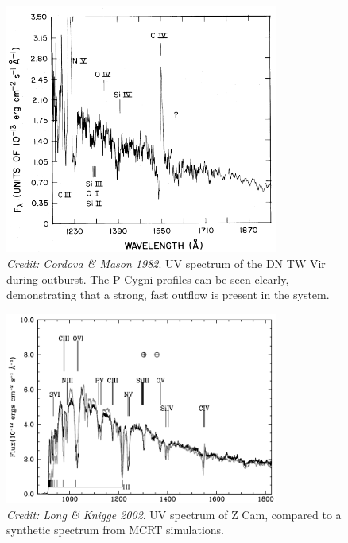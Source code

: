 \begin{figure}
\centering
\includegraphics[width=0.8\textwidth]{figures/02-outflows/cordova_mason.png}
\caption
{
{\sl Credit: Cordova \& Mason 1982}. 
UV spectrum of the DN TW Vir during outburst. The P-Cygni profiles
can be seen clearly, demonstrating that a strong, fast outflow is present
in the system. 
} 
\label{fig:cordova}
\end{figure}

\begin{figure}
\centering
\includegraphics[width=0.8\textwidth]{figures/02-outflows/zcam_lk02.png}
\caption
{
{\sl Credit: Long \& Knigge 2002}. 
UV spectrum of Z Cam, compared to a synthetic spectrum from MCRT simulations.
} 
\label{fig:zcam_lk02}
\end{figure}

